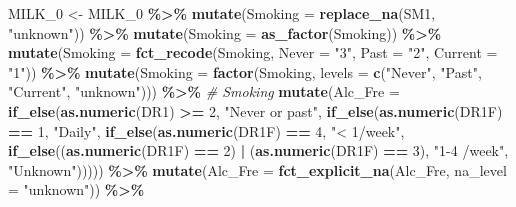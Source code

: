 \documentclass[
]{article}
\newenvironment{Shaded}{\begin{snugshade}}{\end{snugshade}}
\newcommand{\CommentTok}[1]{\textcolor[rgb]{0.56,0.35,0.01}{\textit{#1}}}
\newcommand{\DataTypeTok}[1]{\textcolor[rgb]{0.13,0.29,0.53}{#1}}
\newcommand{\DecValTok}[1]{\textcolor[rgb]{0.00,0.00,0.81}{#1}}
\newcommand{\KeywordTok}[1]{\textcolor[rgb]{0.13,0.29,0.53}{\textbf{#1}}}
\newcommand{\NormalTok}[1]{#1}
\newcommand{\OperatorTok}[1]{\textcolor[rgb]{0.81,0.36,0.00}{\textbf{#1}}}
\newcommand{\StringTok}[1]{\textcolor[rgb]{0.31,0.60,0.02}{#1}}
\begin{document}
\begin{Shaded}
\begin{Highlighting}[]
\NormalTok{MILK\_}\DecValTok{0}\NormalTok{ \textless{}{-}}\StringTok{  }\NormalTok{MILK\_}\DecValTok{0} \OperatorTok{\%\textgreater{}\%}\StringTok{ }
\StringTok{  }\KeywordTok{mutate}\NormalTok{(}\DataTypeTok{Smoking =} \KeywordTok{replace\_na}\NormalTok{(SM1, }\StringTok{"unknown"}\NormalTok{)) }\OperatorTok{\%\textgreater{}\%}\StringTok{ }
\StringTok{  }\KeywordTok{mutate}\NormalTok{(}\DataTypeTok{Smoking =} \KeywordTok{as\_factor}\NormalTok{(Smoking)) }\OperatorTok{\%\textgreater{}\%}\StringTok{ }
\StringTok{  }\KeywordTok{mutate}\NormalTok{(}\DataTypeTok{Smoking =} \KeywordTok{fct\_recode}\NormalTok{(Smoking, }\DataTypeTok{Never =} \StringTok{"3"}\NormalTok{, }\DataTypeTok{Past =} \StringTok{"2"}\NormalTok{, }\DataTypeTok{Current =} \StringTok{"1"}\NormalTok{)) }\OperatorTok{\%\textgreater{}\%}\StringTok{ }
\StringTok{  }\KeywordTok{mutate}\NormalTok{(}\DataTypeTok{Smoking =} \KeywordTok{factor}\NormalTok{(Smoking, }\DataTypeTok{levels =} \KeywordTok{c}\NormalTok{(}\StringTok{"Never"}\NormalTok{, }\StringTok{"Past"}\NormalTok{, }\StringTok{"Current"}\NormalTok{, }\StringTok{"unknown"}\NormalTok{))) }\OperatorTok{\%\textgreater{}\%}\StringTok{  }\CommentTok{\# Smoking}
\StringTok{  }\KeywordTok{mutate}\NormalTok{(}\DataTypeTok{Alc\_Fre =} \KeywordTok{if\_else}\NormalTok{(}\KeywordTok{as.numeric}\NormalTok{(DR1) }\OperatorTok{\textgreater{}=}\StringTok{ }\DecValTok{2}\NormalTok{, }\StringTok{"Never or past"}\NormalTok{, }
                           \KeywordTok{if\_else}\NormalTok{(}\KeywordTok{as.numeric}\NormalTok{(DR1F) }\OperatorTok{==}\StringTok{ }\DecValTok{1}\NormalTok{, }\StringTok{"Daily"}\NormalTok{, }
                                   \KeywordTok{if\_else}\NormalTok{(}\KeywordTok{as.numeric}\NormalTok{(DR1F) }\OperatorTok{==}\StringTok{ }\DecValTok{4}\NormalTok{, }\StringTok{"\textless{} 1/week"}\NormalTok{, }
                                           \KeywordTok{if\_else}\NormalTok{((}\KeywordTok{as.numeric}\NormalTok{(DR1F) }\OperatorTok{==}\StringTok{ }\DecValTok{2}\NormalTok{) }\OperatorTok{|}\StringTok{ }\NormalTok{(}\KeywordTok{as.numeric}\NormalTok{(DR1F) }\OperatorTok{==}\StringTok{ }\DecValTok{3}\NormalTok{), }
                                                   \StringTok{"1{-}4 /week"}\NormalTok{, }\StringTok{"Unknown"}\NormalTok{))))) }\OperatorTok{\%\textgreater{}\%}\StringTok{ }
\StringTok{  }\KeywordTok{mutate}\NormalTok{(}\DataTypeTok{Alc\_Fre =} \KeywordTok{fct\_explicit\_na}\NormalTok{(Alc\_Fre, }\DataTypeTok{na\_level =} \StringTok{"unknown"}\NormalTok{)) }\OperatorTok{\%\textgreater{}\%}\StringTok{ }

\end{Highlighting}
\end{Shaded}
\end{document}
